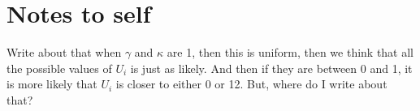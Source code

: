 \section{Notes to self}
Write about that when $\gamma$ and $\kappa$ are 1, then this is uniform, then we think that all the possible values of $U_i$ is just as likely. And then if they are between 0 and 1, it is more likely that $U_i$ is closer to either 0 or 12. But, where do I write about that?






